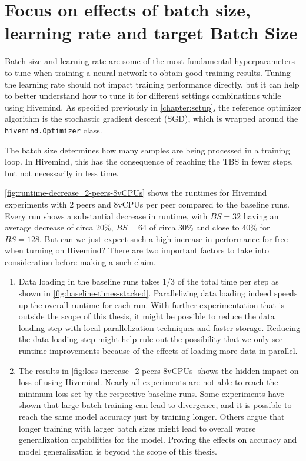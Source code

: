 
\section{Focus on effects of batch size, learning rate and target Batch Size}\label{sec:focus-effect-bs-lr-tbs}

Batch size and learning rate are some of the most fundamental hyperparameters to tune when training a neural network to obtain good training results.
Tuning the learning rate should not impact training performance directly, but it can help to better understand how to tune it for different settings combinations while using Hivemind.
As specified previously in \autoref{chapter:setup}, the reference optimizer algorithm is the stochastic gradient descent (SGD), which is wrapped around the \texttt{hivemind.Optimizer} class.

The batch size determines how many samples are being processed in a training loop.
In Hivemind, this has the consequence of reaching the TBS in fewer steps, but not necessarily in less time.

\autoref{fig:runtime-decrease_2-peers-8vCPUs} shows the runtimes for Hivemind experiments with 2 peers and 8vCPUs per peer compared to the baseline runs.
Every run shows a substantial decrease in runtime, with $BS=32$ having an average decrease of circa 20\%, $BS=64$ of circa 30\% and close to 40\% for $BS=128$.
But can we just expect such a high increase in performance for free when turning on Hivemind?
There are two important factors to take into consideration before making a such claim.

\begin{enumerate}
    \item Data loading in the baseline runs takes 1/3 of the total time per step as shown in \autoref{fig:baseline-times-stacked}.
          Parallelizing data loading indeed speeds up the overall runtime for each run.
          With further experimentation that is outside the scope of this thesis, it might be possible to reduce the data loading step with local parallelization techniques and faster storage.
          Reducing the data loading step might help rule out the possibility that we only see runtime improvements because of the effects of loading more data in parallel.
    \item The results in \autoref{fig:loss-increase_2-peers-8vCPUs} shows the hidden impact on loss of using Hivemind.
          Nearly all experiments are not able to reach the minimum loss set by the respective baseline runs.
          Some experiments \cite{you2017scaling} have shown that large batch training can lead to divergence, and it is possible to reach the same model accuracy just by training longer.
          Others \cite{DBLP:journals/corr/KeskarMNST16} argue that longer training with larger batch sizes might lead to overall worse generalization capabilities for the model.
          Proving the effects on accuracy and model generalization is beyond the scope of this thesis.
\end{enumerate}

